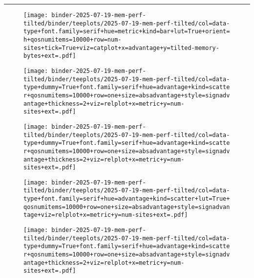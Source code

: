 \begin{figure*}
\vspace{2ex}

\hrule

\vspace{1ex}

\begin{subfigure}{\textwidth}

\texttt{[image: binder-2025-07-19-mem-perf-tilted/binder/teeplots/2025-07-19-mem-perf-tilted/col=data-type+font.family=serif+hue=metric+kind=bar+lut=True+orient=h+qosnumitems=10000+row=num-sites+tick=True+viz=catplot+x=advantage+y=tilted-memory-bytes+ext=.pdf]}

\vspace{-1ex}

\texttt{[image: binder-2025-07-19-mem-perf-tilted/binder/teeplots/2025-07-19-mem-perf-tilted/col=data-type+dummy=True+font.family=serif+hue=advantage+kind=scatter+qosnumitems=10000+row=one+size=absadvantage+style=signadvantage+thickness=2+viz=relplot+x=metric+y=num-sites+ext=.pdf]}

\vspace{-3ex}

\texttt{[image: binder-2025-07-19-mem-perf-tilted/binder/teeplots/2025-07-19-mem-perf-tilted/col=data-type+dummy=True+font.family=serif+hue=advantage+kind=scatter+qosnumitems=10000+row=one+size=absadvantage+style=signadvantage+thickness=2+viz=relplot+x=metric+y=num-sites+ext=.pdf]}

\vspace{-1.2ex}

\texttt{[image: binder-2025-07-19-mem-perf-tilted/binder/teeplots/2025-07-19-mem-perf-tilted/col=data-type+font.family=serif+hue=advantage+kind=scatter+lut=True+qosnumitems=10000+row=one+size=absadvantage+style=signadvantage+viz=relplot+x=metric+y=num-sites+ext=.pdf]}

\vspace{-2.8ex}

\texttt{[image: binder-2025-07-19-mem-perf-tilted/binder/teeplots/2025-07-19-mem-perf-tilted/col=data-type+dummy=True+font.family=serif+hue=advantage+kind=scatter+qosnumitems=10000+row=one+size=absadvantage+style=signadvantage+thickness=2+viz=relplot+x=metric+y=num-sites+ext=.pdf]}

\vspace{-2ex}


\end{subfigure}
\end{figure*}
